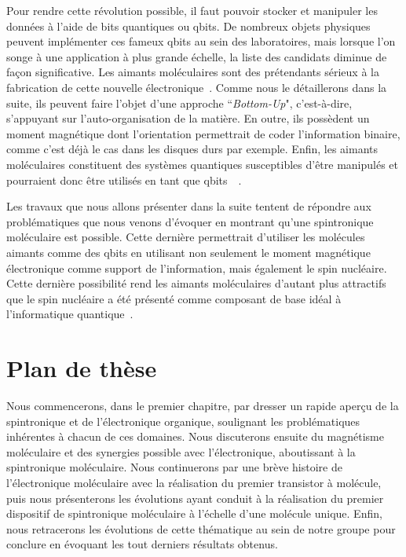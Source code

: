 Pour rendre cette révolution possible, il faut pouvoir stocker et manipuler les données à l'aide de bits quantiques ou qbits. De nombreux objets physiques peuvent implémenter ces fameux qbits au sein des laboratoires, mais lorsque l'on songe à une application à plus grande échelle, la liste des candidats diminue de façon significative. Les aimants moléculaires sont des prétendants sérieux à la fabrication de cette nouvelle électronique~\cite{Bogani2008,Sanvito2011}. Comme nous le détaillerons dans la suite, ils peuvent faire l'objet d'une approche ``\textit{Bottom-Up}", c'est-à-dire, s'appuyant sur l'auto-organisation de la matière. En outre, ils possèdent un moment magnétique dont l'orientation permettrait de coder l'information binaire, comme c'est déjà le cas dans les disques durs par exemple. Enfin, les aimants moléculaires constituent des systèmes quantiques susceptibles d'\^etre manipulés et pourraient donc \^etre utilisés en tant que qbits~~\cite{Leuenberger2001,Bertaina2008,Schlegel2008}.

Les travaux que nous allons présenter dans la suite tentent de répondre aux problématiques que nous venons d'évoquer en montrant qu'une spintronique moléculaire est possible. Cette dernière permettrait d'utiliser les molécules aimants comme des qbits en utilisant non seulement le moment magnétique électronique comme support de l'information, mais également le spin nucléaire. Cette dernière possibilité rend les aimants moléculaires d'autant plus attractifs que le spin nucléaire a été présenté comme composant de base idéal à l'informatique quantique~\cite{Kane1998,Vandersypen2001,Leuenberger2003}.

\newpage
 
\section*{Plan de thèse}

Nous commencerons, dans le premier chapitre, par dresser un rapide aperçu de la spintronique et de l'électronique organique, soulignant les problématiques inhérentes à  chacun de ces domaines. Nous discuterons ensuite du magnétisme moléculaire et des synergies possible avec l'électronique, aboutissant à la spintronique moléculaire. Nous continuerons par une brève histoire de l'électronique moléculaire avec la réalisation du premier transistor à molécule, puis nous présenterons les évolutions ayant conduit à la réalisation du premier dispositif de spintronique moléculaire à l'échelle d'une molécule unique. Enfin, nous retracerons les évolutions de cette thématique au sein de notre groupe pour conclure en évoquant les tout derniers résultats obtenus.

